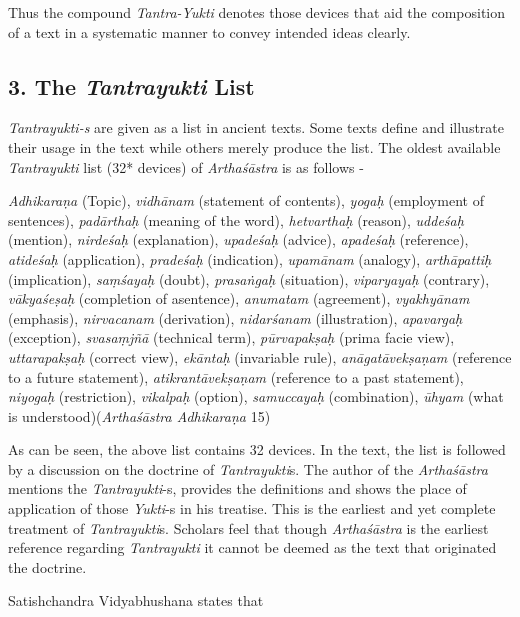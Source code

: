 Thus the compound \textit{Tantra-Yukti} denotes those devices that aid the composition of a text in a systematic manner to convey intended ideas clearly.


\subsection*{3. The \textit{Tantrayukti} List }

\textit{Tantrayukti-s} are given as a list in ancient texts. Some texts define and illustrate their usage in the text while others merely produce the list. The oldest available \textit{Tantrayukti} list (32* devices) of \textit{Arthaśāstra} is as follows -

\textit{Adhikaraṇa} (Topic), \textit{vidhānam} (statement of contents), \textit{yogaḥ} (employment of sentences), \textit{padārthaḥ} (meaning of the word), \textit{hetvarthaḥ} (reason), \textit{uddeśaḥ} (mention), \textit{nirdeśaḥ} (explanation), \textit{upadeśaḥ} (advice), \textit{apa\-deśaḥ} (reference), \textit{atideśaḥ} (application), \textit{pradeśaḥ} (indication), \textit{upamānam} (analogy), \textit{arthāpattiḥ} (implication), \textit{saṃśayaḥ} (doubt), \textit{prasaṅgaḥ} (situation), \textit{viparyayaḥ} (contrary), \textit{vākyaśeṣaḥ} (completion of a\break sentence), \textit{anumatam} (agreement), \textit{vyakhyānam} (emphasis), \textit{nirvacanam} (derivation), \textit{nidarśanam} (illustration), \textit{apavargaḥ} (exception), \textit{svasaṃjñā} (technical term), \textit{pūrvapakṣaḥ} (prima facie view), \textit{uttarapakṣaḥ} (correct view), \textit{ekāntaḥ} (invariable rule), \textit{anāgatāvekṣaṇam} (reference to a future statement), \textit{atikrantāvekṣaṇam} (reference to a past statement), \textit{niyogaḥ} (restriction), \textit{vikalpaḥ} (option), \textit{samuccayaḥ} (combination), \textit{ūhyam} (what is understood)\hfill (\textit{Arthaśāstra Adhikaraṇa} 15)

As can be seen, the above list contains 32 devices. In the text, the list is followed by a discussion on the doctrine of \textit{Tantrayukti}s. The author of the \textit{Arthaśāstra} mentions the \textit{Tantrayukti}-s, provides the definitions and shows the place of application of those \textit{Yukti}-s in his treatise. This is the earliest and yet complete treatment of \textit{Tantrayukti}s. Scholars feel that though \textit{Arthaśāstra} is the earliest reference regarding \textit{Tantrayukti} it cannot be deemed as the text that originated the doctrine.

Satishchandra Vidyabhushana states that

